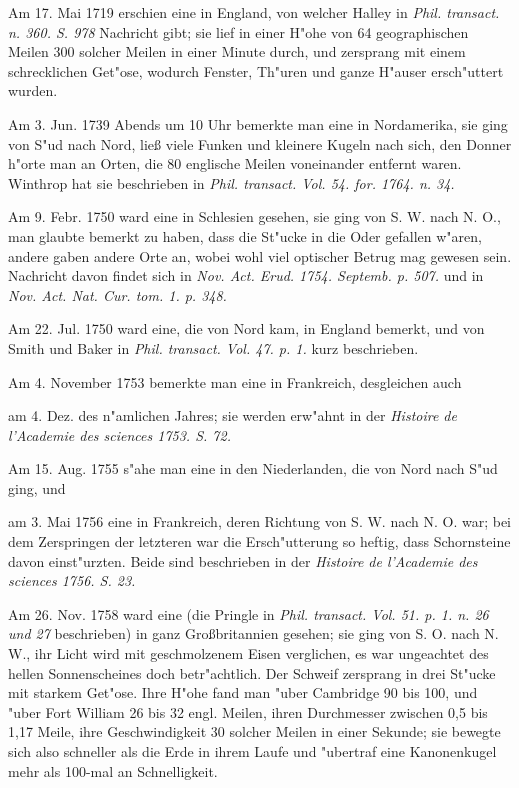 \documentclass[a4paper, 11pt, oneside, polutonikogreek, german]{article}
\begin{document}
Am 17. Mai 1719 erschien eine in England, von welcher Halley in \emph{Phil. transact. n. 360. S. 978} Nachricht gibt; sie lief in einer H"ohe von 64 geographischen Meilen 300 solcher Meilen in einer Minute durch, und zersprang mit einem schrecklichen Get"ose, wodurch Fenster, Th"uren und ganze H"auser ersch"uttert wurden.

Am 3. Jun. 1739 Abends um 10 Uhr bemerkte man eine in Nordamerika, sie ging von S"ud nach Nord, ließ viele Funken und kleinere Kugeln nach sich, den Donner h"orte man an Orten, die 80 englische Meilen voneinander entfernt waren. Winthrop hat sie beschrieben in \emph{Phil. transact. Vol. 54. for. 1764. n. 34.}

Am 9. Febr. 1750 ward eine in Schlesien gesehen, sie ging von S. W. nach N. O., man glaubte bemerkt zu haben, dass die St"ucke in die Oder gefallen w"aren, andere gaben andere Orte an, wobei wohl viel optischer Betrug mag gewesen sein. Nachricht davon findet sich in \emph{Nov. Act. Erud. 1754. Septemb. p. 507.} und in \emph{Nov. Act. Nat. Cur. tom. 1. p. 348.}

Am 22. Jul. 1750 ward eine, die von Nord kam, in England bemerkt, und von Smith und Baker in \emph{Phil. transact. Vol. 47. p. 1.} kurz beschrieben.

Am 4. November 1753 bemerkte man eine in Frankreich, desgleichen auch

am 4. Dez. des n"amlichen Jahres; sie werden erw"ahnt in der \emph{Histoire de l'Academie des sciences 1753. S. 72.}

Am 15. Aug. 1755 s"ahe man eine in den Niederlanden, die von Nord nach S"ud ging, und

am 3. Mai 1756 eine in Frankreich, deren Richtung von S. W. nach N. O. war; bei dem Zerspringen der letzteren war die Ersch"utterung so heftig, dass Schornsteine davon einst"urzten. Beide sind beschrieben in der \emph{Histoire de l'Academie des sciences 1756. S. 23.}

Am 26. Nov. 1758 ward eine (die Pringle in \emph{Phil. transact. Vol. 51. p. 1. n. 26 und 27} beschrieben) in ganz Großbritannien gesehen; sie ging von S. O. nach N. W., ihr Licht wird mit geschmolzenem Eisen verglichen, es war ungeachtet des hellen Sonnenscheines doch betr"achtlich. Der Schweif zersprang in drei St"ucke mit starkem Get"ose. Ihre H"ohe fand man "uber Cambridge 90 bis 100, und "uber Fort William 26 bis 32 engl. Meilen, ihren Durchmesser zwischen 0,5 bis 1,17 Meile, ihre Geschwindigkeit 30 solcher Meilen in einer Sekunde; sie bewegte sich also schneller als die Erde in ihrem Laufe und "ubertraf eine Kanonenkugel mehr als 100-mal an Schnelligkeit.
\end{document}
